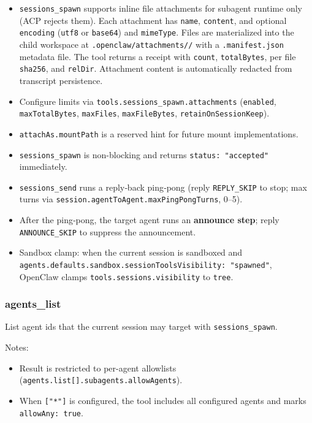 \begin{itemize}
  \item \texttt{sessions\_spawn} supports inline file attachments for subagent runtime only (ACP rejects them). Each attachment has \texttt{name}, \texttt{content}, and optional \texttt{encoding} (\texttt{utf8} or \texttt{base64}) and \texttt{mimeType}. Files are materialized into the child workspace at \texttt{.openclaw/attachments//} with a \texttt{.manifest.json} metadata file. The tool returns a receipt with \texttt{count}, \texttt{totalBytes}, per file \texttt{sha256}, and \texttt{relDir}. Attachment content is automatically redacted from transcript persistence.
  \item Configure limits via \texttt{tools.sessions\_spawn.attachments} (\texttt{enabled}, \texttt{maxTotalBytes}, \texttt{maxFiles}, \texttt{maxFileBytes}, \texttt{retainOnSessionKeep}).
  \item \texttt{attachAs.mountPath} is a reserved hint for future mount implementations.
  \item \texttt{sessions\_spawn} is non-blocking and returns \texttt{status: "accepted"} immediately.
  \item \texttt{sessions\_send} runs a reply‑back ping‑pong (reply \texttt{REPLY\_SKIP} to stop; max turns via \texttt{session.agentToAgent.maxPingPongTurns}, 0–5).
  \item After the ping‑pong, the target agent runs an \textbf{announce step}; reply \texttt{ANNOUNCE\_SKIP} to suppress the announcement.
  \item Sandbox clamp: when the current session is sandboxed and \texttt{agents.defaults.sandbox.sessionToolsVisibility: "spawned"}, OpenClaw clamps \texttt{tools.sessions.visibility} to \texttt{tree}.
\end{itemize}


\subsubsection{agents\_list}


List agent ids that the current session may target with \texttt{sessions\_spawn}.

Notes:

\begin{itemize}
  \item Result is restricted to per-agent allowlists (\texttt{agents.list[].subagents.allowAgents}).
  \item When \texttt{["*"]} is configured, the tool includes all configured agents and marks \texttt{allowAny: true}.
\end{itemize}



